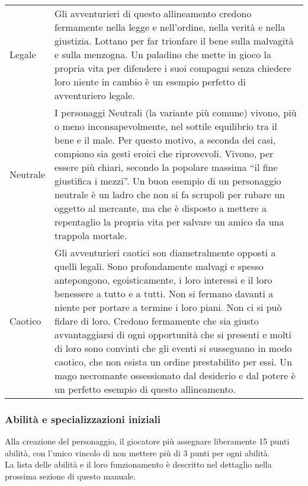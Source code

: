\documentclass[../manuale_main.tex]{subfiles}
\begin{document}
\renewcommand{\arraystretch}{1.5}
\begin{tabularx}{\linewidth}{ l X }
Legale&Gli avventurieri di questo allineamento credono fermamente nella legge e nell'ordine, nella verità e nella giustizia. Lottano per far trionfare il bene sulla malvagità e sulla menzogna. Un paladino che mette in gioco la propria vita per difendere i suoi compagni senza chiedere loro niente in cambio è un esempio perfetto di avventuriero legale.\\

Neutrale&I personaggi Neutrali (la variante più comune) vivono, più o meno inconsapevolmente, nel sottile equilibrio tra il bene e il male. Per questo motivo, a seconda dei casi, compiono sia gesti eroici che riprovevoli. Vivono, per essere più chiari, secondo la popolare massima “il fine giustifica i mezzi”. Un buon esempio di un personaggio neutrale è un ladro che non si fa scrupoli per rubare un oggetto al mercante, ma che è disposto a mettere a repentaglio la propria vita per salvare un amico da una trappola mortale.\\

Caotico&Gli avventurieri caotici son diametralmente opposti a quelli legali. Sono profondamente malvagi e spesso antepongono, egoisticamente, i loro interessi e il loro benessere a tutto e a tutti. Non si fermano davanti a niente per portare a termine i loro piani. Non ci si può fidare di loro. Credono fermamente che sia giusto avvantaggiarsi di ogni opportunità che si presenti e molti di loro sono convinti che gli eventi si susseguano in modo caotico, che non esista un ordine prestabilito per essi. Un mago necromante ossessionato dal desiderio e dal potere è un perfetto esempio di questo allineamento.\\
\end{tabularx}

\subsubsection{Abilità e specializzazioni iniziali}
Alla creazione del personaggio, il giocatore più assegnare liberamente 15 punti abilità, con l'unico vincolo di non mettere più di 3 punti per ogni abilità.\\
La lista delle abilità e il loro funzionamento è descritto nel dettaglio nella prossima sezione di questo manuale.
\end{document}
